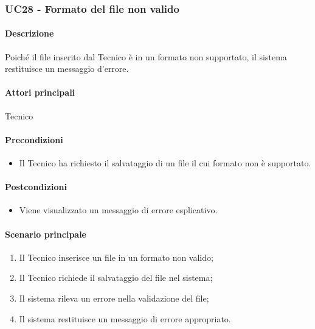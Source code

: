 \subsubsection{UC28 - Formato del file non valido}\label{UC28}
\paragraph*{Descrizione}
Poiché il file inserito dal Tecnico è in un formato non supportato, il sistema restituisce un messaggio d'errore.

\paragraph*{Attori principali}
Tecnico

\paragraph*{Precondizioni}
\begin{itemize}
  \item Il Tecnico ha richiesto il salvataggio di un file il cui formato non è supportato.
\end{itemize}

\paragraph*{Postcondizioni}
\begin{itemize}
  \item Viene visualizzato un messaggio di errore esplicativo.
\end{itemize}

\paragraph*{Scenario principale}
\begin{enumerate}
  \item Il Tecnico inserisce un file in un formato non valido;
  \item Il Tecnico richiede il salvataggio del file nel sistema;
  \item Il sistema rileva un errore nella validazione del file;
  \item Il sistema restituisce un messaggio di errore appropriato.
\end{enumerate}
